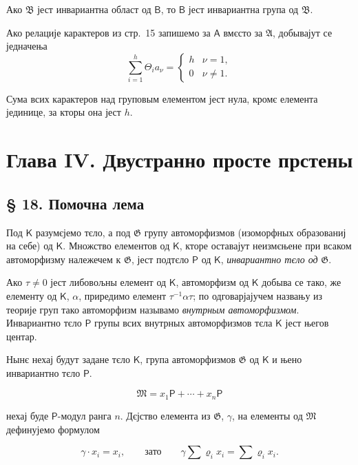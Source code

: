\documentclass[11pt]{article}
\begin{document}
Ако \(\mathfrak B\) јест инвариантна област од \(\mathsf B\), то \(\mathsf B\) јест инвариантна група од \(\mathfrak B\).

Ако релације карактеров из стр.~15 запишемо за \(\mathsf A\) вмєсто за \(\mathfrak A\), добывајут се једначења
\[
\sum_{i=1}^{h} \Theta_i a_\nu =
\begin{cases}
h & \nu=1,\\
0 & \nu\ne 1.
\end{cases}
\]

Сума всих карактеров над груповым елементом јест нула, кромє елемента јединице, за кторы она јест \(h\).

\section*{Глава IV. Двустранно просте прстены}\label{kapitel-iv.-zweiseitig-einfache-ringe}

\subsection*{§ 18. Помочна лема}\label{ein-hilfssatz}

Под \(\mathsf K\) разумєјемо тєло, а под \(\mathfrak G\) групу автоморфизмов (изоморфных образованиј на себе) од \(\mathsf K\). Множство елементов од \(\mathsf K\), кторе оставајут неизмєњене при всаком автоморфизму належечем к \(\mathfrak G\), јест подтєло \(\mathsf P\) од \(\mathsf K\), \emph{инвариантно тєло од} \(\mathfrak G\).

Ако \(\tau\ne 0\) јест либовољны елемент од \(\mathsf K\), автоморфизм од \(\mathsf K\) добыва се тако, же елементу од \(\mathsf K\), \(\alpha\), приредимо елемент \(\tau^{-1}\alpha\tau\); по одговарјајучем назвању из теорије груп тако автоморфизм называмо \emph{внутрным автоморфизмом}. Инвариантно тєло \(\mathsf P\) групы всих внутрных автоморфизмов тєла \(\mathsf K\) јест његов центар.

Нынє нехај будут задане тєло \(\mathsf K\), група автоморфизмов \(\mathfrak G\) од \(\mathsf K\) и њено инвариантно тєло \(\mathsf P\).

\[
\mathfrak M=x_1\mathsf P+\cdots+x_n\mathsf P
\]

нехај буде \(\mathsf P\)-модул ранга \(n\). Дєјство елемента из \(\mathfrak G\), \(\gamma\), на елементы од \(\mathfrak M\) дефинујемо формулом

\[
\gamma\cdot x_i=x_i,\qquad\text{зато}\qquad
\gamma\sum \varrho_i x_i=\sum \varrho_i x_i.
\]
\end{document}

